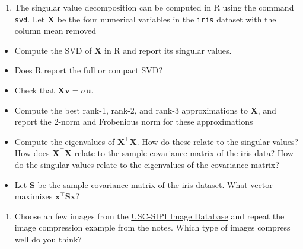 \documentclass[]{book}
\newenvironment{Shaded}{\begin{snugshade}}{\end{snugshade}}
\newcommand{\CommentTok}[1]{\textcolor[rgb]{0.56,0.35,0.01}{\textit{#1}}}
\newcommand{\DecValTok}[1]{\textcolor[rgb]{0.00,0.00,0.81}{#1}}
\newcommand{\KeywordTok}[1]{\textcolor[rgb]{0.13,0.29,0.53}{\textbf{#1}}}
\newcommand{\NormalTok}[1]{#1}
\newcommand{\OperatorTok}[1]{\textcolor[rgb]{0.81,0.36,0.00}{\textbf{#1}}}
\newcommand{\StringTok}[1]{\textcolor[rgb]{0.31,0.60,0.02}{#1}}
\providecommand{\tightlist}{%
  \setlength{\itemsep}{0pt}\setlength{\parskip}{0pt}}
\theoremstyle{definition}
\theoremstyle{definition}
\theoremstyle{definition}
\theoremstyle{remark}
\begin{document}
\begin{enumerate}
\def\labelenumi{\arabic{enumi}.}
\setcounter{enumi}{1}
\tightlist
\item
  The singular value decomposition can be computed in R using the command \texttt{svd}. Let \(\mathbf X\) be the four numerical variables in the \texttt{iris} dataset with the column mean removed
\end{enumerate}

\begin{Shaded}
\end{Shaded}

\begin{itemize}
\item
  Compute the SVD of \(\mathbf X\) in R and report its singular values.
\item
  Does R report the full or compact SVD?
\item
  Check that \(\mathbf X\mathbf v= \sigma \mathbf u\).
\item
  Compute the best rank-1, rank-2, and rank-3 approximations to \(\mathbf X\), and report the 2-norm and Frobenious norm for these approximations
\item
  Compute the eigenvalues of \(\mathbf X^\top \mathbf X\). How do these relate to the singular values? How does \(\mathbf X^\top \mathbf X\) relate to the sample covariance matrix of the iris data? How do the singular values relate to the eigenvalues of the covariance matrix?
\item
  Let \(\mathbf S\) be the sample covariance matrix of the iris dataset. What vector maximizes \(\mathbf x^\top \mathbf S\mathbf x\)?
\end{itemize}

\begin{enumerate}
\def\labelenumi{\arabic{enumi}.}
\setcounter{enumi}{2}
\tightlist
\item
  Choose an few images from the \href{http://sipi.usc.edu/database/}{USC-SIPI Image Database} and repeat the image compression example from the notes. Which type of images compress well do you think?
\end{enumerate}
\end{document}
